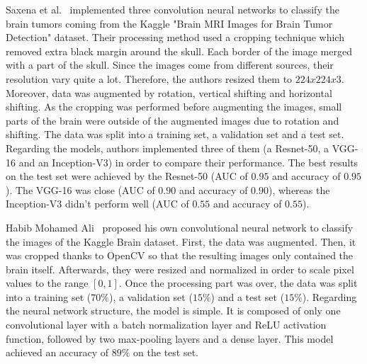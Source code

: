 Saxena et al.~\cite{31} implemented three convolution neural networks to classify the brain tumors coming from the Kaggle "Brain MRI Images for Brain Tumor Detection" dataset. Their processing method used a cropping technique which removed extra black margin around the skull. Each border of the image merged with a part of the skull. Since the images come from different sources, their resolution vary quite a lot. Therefore, the authors resized them to $224x224x3$. Moreover, data was augmented by rotation, vertical shifting and horizontal shifting. As the cropping was performed before augmenting the images, small parts of the brain were outside of the augmented images due to rotation and shifting. The data was split into a training set, a validation set and a test set. Regarding the models, authors implemented three of them (a Resnet-50, a VGG-16 and an Inception-V3) in order to compare their performance. The best results on the test set were achieved by the Resnet-50 (AUC of $0.95$ and accuracy of $0.95$). The VGG-16 was close (AUC of $0.90$ and accuracy of $0.90$), whereas the Inception-V3 didn't perform well (AUC of $0.55$ and accuracy of $0.55$).


Habib Mohamed Ali~\cite{04} proposed his own convolutional neural network to classify the images of the Kaggle Brain dataset. First, the data was augmented. Then, it was cropped thanks to OpenCV so that the resulting images only contained the brain itself. Afterwards, they were resized and normalized in order to scale pixel values to the range $[0,1]$. Once the processing part was over, the data was split into a training set ($70\%$), a validation set ($15\%$) and a test set ($15\%$). Regarding the neural network structure, the model is simple. It is composed of only one convolutional layer with a batch normalization layer and ReLU activation function, followed by two max-pooling layers and a dense layer. This model achieved an accuracy of $89\%$ on the test set.

